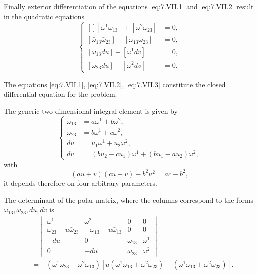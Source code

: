 \documentclass[leqno,11pt]{book}
\numberwithin{equation}{chapter}
\theoremstyle{shape1}
\theoremstyle{shape0}
\theoremstyle{shape2}
\theoremstyle{definition}
\begin{document}
Finally exterior differentiation of the equations \eqref{eq:7.VII.1} and \eqref{eq:7.VII.2} result in the quadratic equations
\begin{equation}
  \label{eq:7.VII.3}\tag{VII, 3}
  \left\{
    \begin{aligned}[]
      [\omega^{1}\omega_{13}]+[\omega^{2}\omega_{23}]&=0,\\
      [\bar\omega_{13}\bar\omega_{23}]-[\omega_{13}\omega_{23}]&=0,\\
      [\omega_{13}du]+[\omega^{1}dv]&=0,\\
      [\omega_{23}du]+[\omega^{2}dv]&=0.
    \end{aligned}
  \right.
\end{equation}

The equations \eqref{eq:7.VII.1}, \eqref{eq:7.VII.2}, \eqref{eq:7.VII.3} constitute the closed differential equation for the problem.

The generic two dimensional integral element is given by
\begin{equation}
  \label{eq:7.VII.4}\tag{VII, 4}
  \left\{
    \begin{aligned}
      \omega_{13}&=a\omega^{1}+b\omega^{2},\\
      \omega_{23}&=b\omega^{1}+c\omega^{2},\\
      du&=u_{1}\omega^{1}+u_{2}\omega^{2},\\
      dv&=(bu_{2}-cu_{1})\omega^{1}+(bu_{1}-au_{2})\omega^{2},
    \end{aligned}
  \right.
\end{equation}
with
\begin{equation}
  \label{eq:7.VII.5}\tag{VII, 5}
  (au+v)(cu+v)-b^{2}u^{2}=ac-b^{2},
\end{equation}
it depends therefore on four arbitrary parameters.

The determinant of the polar matrix, where the columns correspond to the forms $\omega_{13},\omega_{23},du,dv$ is
\begin{align*}
&\quad
\begin{vmatrix}
  \omega^{1}&\omega^{2}&0&0\\
  \omega_{23}-u\bar\omega_{23}&-\omega_{13}+u\bar\omega_{13}&0&0\\
  -du&0&\omega_{13}&\omega^{1}\\
  0&-du&\omega_{23}&\omega^{2}
\end{vmatrix}\\
&=-(\omega^{1}\omega_{23}-\omega^{2}\omega_{13})[u(\omega^{1}\bar\omega_{13}+\omega^{2}\bar\omega_{23})-(\omega^{1}\omega_{13}+\omega^{2}\omega_{23})].
\end{align*}
\end{document}
